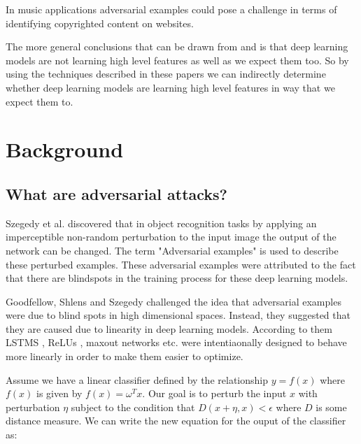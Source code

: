 \documentclass[journal,onecolumn]{IEEEtran}
\begin{document}
In music applications adversarial examples could pose a challenge in terms of identifying copyrighted content on websites. 

The more general conclusions that can be drawn from \cite{szegedy_intriguing_2013} and \cite{goodfellow_explaining_2014} is that deep learning models are not learning high level features as well as we expect them too. So by using the techniques described in these papers we can indirectly determine whether deep learning models are learning high level features in way that we expect them to. 



 

	

\section{Background}


\subsection{What are adversarial attacks?}
Szegedy et al. \cite{szegedy_intriguing_2013} discovered that in object recognition tasks by applying an imperceptible non-random perturbation to the input image the output of the network can be changed. The term "Adversarial examples" is used to describe these perturbed examples. These adversarial examples were attributed to the fact that there are blindspots in the training process for these deep learning models. %

Goodfellow, Shlens and Szegedy \cite{goodfellow_explaining_2014} challenged the idea that adversarial examples were due to blind spots in high dimensional spaces. Instead, they suggested that they are caused due to linearity in deep learning models. According to them LSTMS \cite{hochreiter_long_1997}, ReLUs \cite{maas_rectier_nodate}, maxout networks \cite{zhang_improving_2014} etc. were intentiaonally designed to behave more linearly in order to make them easier to optimize. %

Assume we have a linear classifier defined by the relationship $y = f(x)$ where $f(x)$ is given by $f(x) = \omega^{T}x$. Our goal is to perturb the input $x$ with perturbation $\eta$ subject to the condition that $D(x+\eta,x)<\epsilon$ where $D$ is some distance measure. We can write the new equation for the ouput of the classifier as:
\end{document}
